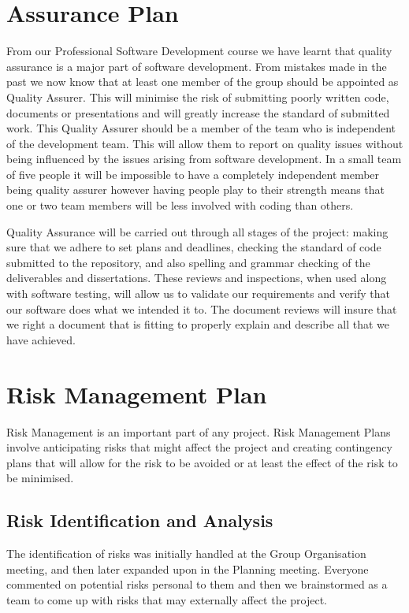 \documentclass{l3proj}
\begin{document}
\section{Assurance Plan}
\label{sect:a-plan}                                                                               
From our Professional Software Development course we have learnt that quality assurance is a major part of software development. From mistakes made in the past we now know that at least one member of the group should be appointed as Quality Assurer. This will minimise the risk of submitting poorly written code, documents or presentations and will greatly increase the standard of submitted work. This Quality Assurer should be a member of the team who is independent of the development team. This will allow them to report on quality issues without being influenced by the issues arising from software development. In a small team of five people it will be impossible to have a completely independent member being quality assurer however having people play to their strength means that one or two team members will be less involved with coding than others.

Quality Assurance will be carried out through all stages of the project: making sure that we adhere to set plans and deadlines, checking the standard of code submitted to the repository, and also spelling and grammar checking of the deliverables and dissertations.
These reviews and inspections, when used along with software testing, will allow us to validate our requirements and verify that our software does what we intended it to. The document reviews will insure that we right a document that is fitting to properly explain and describe all that we have achieved.

\section{Risk Management Plan}
\label{sect:risk-man}
Risk Management is an important part of any project. Risk Management Plans involve anticipating risks that might affect the project and creating contingency plans that will allow for the risk to be avoided or at least the effect of the risk to be minimised.
\subsection{Risk Identification and Analysis} 
The identification of risks was initially handled at the Group Organisation meeting, and then later expanded upon in the Planning meeting. Everyone commented on potential risks personal to them and then we brainstormed as a team to come up with risks that may externally affect the project.
\end{document}
